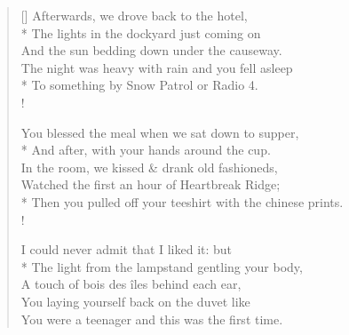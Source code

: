 \settowidth{\versewidth}{In the room, we kissed \& drank old fashioneds,}
\begin{verse}[\versewidth]
Afterwards, we drove back to the hotel,\\*
\vin The lights in the dockyard just coming on\\
And the sun bedding down under the causeway.\\
\vin The night was heavy with rain and you fell asleep\\*
To something by Snow Patrol or Radio 4.\\!

You blessed the meal when we sat down to supper,\\*
\vin And after, with your hands around the cup.\\
In the room, we kissed \& drank old fashioneds,\\
\vin Watched the first  an hour of {\hoskeroe Heartbreak Ridge};\\*
Then you pulled off your teeshirt with the chinese prints.\\!

I could never admit that I liked it: but\\*
\vin The light from the lampstand gentling your body,\\
A touch of bois des \^iles behind each ear,\\
\vin You laying yourself back on the duvet like\\
You were a teenager and this was the first time.
\end{verse}

